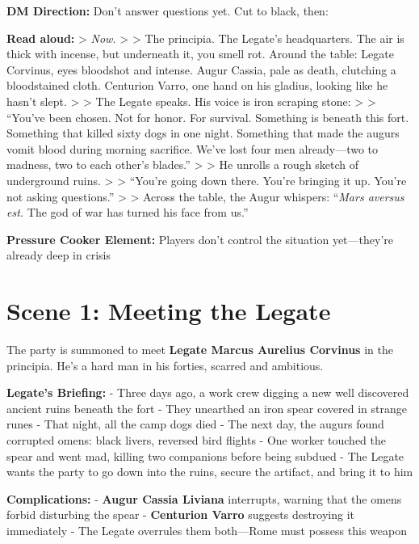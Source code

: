 \documentclass[
]{book}
\begin{document}
\textbf{DM Direction:} Don't answer questions yet. Cut to black, then:

\textbf{Read aloud:} \textgreater{} \emph{Now.} \textgreater{}
\textgreater{} The principia. The Legate's headquarters. The air is
thick with incense, but underneath it, you smell rot. Around the table:
Legate Corvinus, eyes bloodshot and intense. Augur Cassia, pale as
death, clutching a bloodstained cloth. Centurion Varro, one hand on his
gladius, looking like he hasn't slept. \textgreater{} \textgreater{} The
Legate speaks. His voice is iron scraping stone: \textgreater{}
\textgreater{} ``You've been chosen. Not for honor. For survival.
Something is beneath this fort. Something that killed sixty dogs in one
night. Something that made the augurs vomit blood during morning
sacrifice. We've lost four men already---two to madness, two to each
other's blades.'' \textgreater{} \textgreater{} He unrolls a rough
sketch of underground ruins. \textgreater{} \textgreater{} ``You're
going down there. You're bringing it up. You're not asking questions.''
\textgreater{} \textgreater{} Across the table, the Augur whispers:
``\emph{Mars aversus est.} The god of war has turned his face from us.''

\textbf{Pressure Cooker Element:} Players don't control the situation
yet---they're already deep in crisis

\section{Scene 1: Meeting the Legate}\label{scene-1-meeting-the-legate}

The party is summoned to meet \textbf{Legate Marcus Aurelius Corvinus}
in the principia. He's a hard man in his forties, scarred and ambitious.

\textbf{Legate's Briefing:} - Three days ago, a work crew digging a new
well discovered ancient ruins beneath the fort - They unearthed an iron
spear covered in strange runes - That night, all the camp dogs died -
The next day, the augurs found corrupted omens: black livers, reversed
bird flights - One worker touched the spear and went mad, killing two
companions before being subdued - The Legate wants the party to go down
into the ruins, secure the artifact, and bring it to him

\textbf{Complications:} - \textbf{Augur Cassia Liviana} interrupts,
warning that the omens forbid disturbing the spear - \textbf{Centurion
Varro} suggests destroying it immediately - The Legate overrules them
both---Rome must possess this weapon
\end{document}
